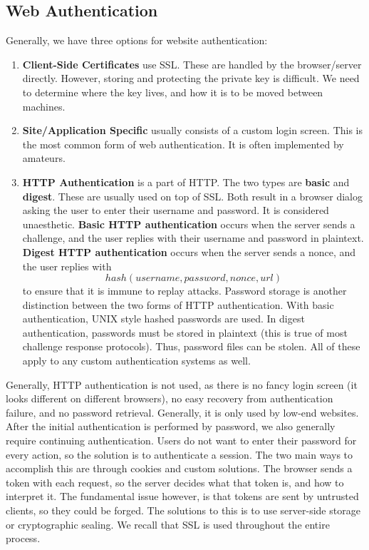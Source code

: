 \documentclass[11pt]{article}
\theoremstyle{plain} %
\theoremstyle{definition}
\theoremstyle{example}
\theoremstyle{remark}
\begin{document}
\subsection{Web Authentication}
Generally, we have three options for website authentication:
\begin{enumerate}
	\item \textbf{Client-Side Certificates} use SSL. These are handled by the browser/server directly. However, storing and protecting the private key is difficult. We need to determine where the key lives, and how it is to be moved between machines. 
	\item \textbf{Site/Application Specific} usually consists of a custom login screen. This is the most common form of web authentication. It is often implemented by amateurs.
	\item \textbf{HTTP Authentication} is a part of HTTP. The two types are \textbf{basic} and \textbf{digest}. These are usually used on top of SSL. Both result in a browser dialog asking the user to enter their username and password. It is considered unaesthetic. \textbf{Basic HTTP authentication} occurs when the server sends a challenge, and the user replies with their username and password in plaintext. \textbf{Digest HTTP authentication} occurs when the server sends a nonce, and the user replies with $$hash(username,password,nonce,url)$$ to ensure that it is immune to replay attacks. Password storage is another distinction between the two forms of HTTP authentication. With basic authentication, UNIX style hashed passwords are used. In digest authentication, passwords must be stored in plaintext (this is true of most challenge response protocols). Thus, password files can be stolen. All of these apply to any custom authentication systems as well. 
\end{enumerate}

Generally, HTTP authentication is not used, as there is no fancy login screen (it looks different on different browsers), no easy recovery from authentication failure, and no password retrieval. Generally, it is only used by low-end websites. After the initial authentication is performed by password, we also generally require continuing authentication. Users do not want to enter their password for every action, so the solution is to authenticate a session. The two main ways to accomplish this are through cookies and custom solutions. The browser sends a token with each request, so the server decides what that token is, and how to interpret it. The fundamental issue however, is that tokens are sent by untrusted clients, so they could be forged. The solutions to this is to use server-side storage or cryptographic sealing. We recall that SSL is used throughout the entire process.
\end{document}
